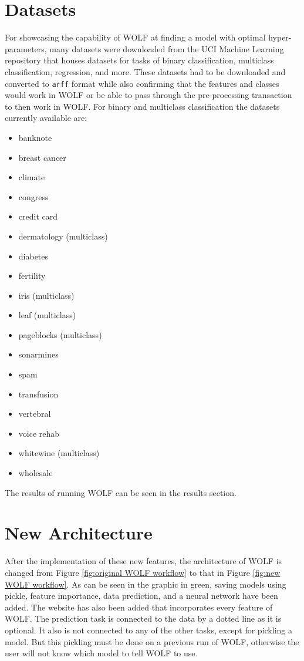 \section*{Datasets}
For showcasing the capability of WOLF at finding a model with optimal hyper-parameters, many datasets were downloaded from the UCI Machine Learning repository \parencite{UCIdata} that houses datasets for tasks of binary classification, multiclass classification, regression, and more. These datasets had to be downloaded and converted to {\tt arff} format while also confirming that the features and classes would work in WOLF or be able to pass through the pre-processing transaction to then work in WOLF. For binary and multiclass classification the datasets currently available are:
\begin{itemize}
	\item banknote
	\item breast cancer
	\item climate
	\item congress
	\item credit card
	\item dermatology (multiclass)
	\item diabetes
	\item fertility
	\item iris (multiclass)
	\item leaf (multiclass)
	\item pageblocks (multiclass)
	\item sonarmines
	\item spam
	\item transfusion
	\item vertebral
	\item voice rehab
	\item whitewine (multiclass)
	\item wholesale
\end{itemize}
The results of running WOLF can be seen in the results section.\newline

\section*{New Architecture}
After the implementation of these new features, the architecture of WOLF is changed from Figure \ref{fig:original WOLF workflow} to that in Figure \ref{fig:new WOLF workflow}. As can be seen in the graphic in green, saving models using pickle, feature importance, data prediction, and a neural network have been added. The website has also been added that incorporates every feature of WOLF. The prediction task is connected to the data by a dotted line as it is optional. It also is not connected to any of the other tasks, except for pickling a model. But this pickling must be done on a previous run of WOLF, otherwise the user will not know which model to tell WOLF to use.

